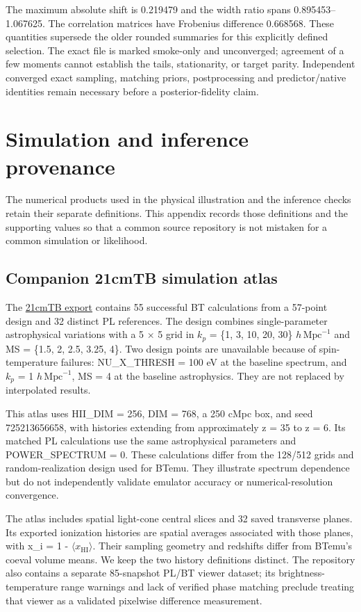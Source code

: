 The maximum absolute shift is 0.219479 and the width ratio spans 0.895453--1.067625. The correlation matrices have Frobenius difference 0.668568. These quantities supersede the older rounded summaries for this explicitly defined selection. The exact file is marked smoke-only and unconverged; agreement of a few moments cannot establish the tails, stationarity, or target parity. Independent converged exact sampling, matching priors, postprocessing and predictor/native identities remain necessary before a posterior-fidelity claim.

\section{Simulation and inference provenance}\label{app:provenance}

The numerical products used in the physical illustration and the inference checks retain their separate definitions. This appendix records those definitions and the supporting values so that a common source repository is not mistaken for a common simulation or likelihood.

\subsection{Companion 21cmTB simulation atlas}\label{companion-21cmtb-simulation-atlas}

The \href{https://github.com/HainaHuang729/21cmTB}{21cmTB export} contains 55 successful BT calculations from a 57-point design and 32 distinct PL references. The design combines single-parameter astrophysical variations with a 5 \(\times\) 5 grid in \ensuremath{k_p} = \{1, 3, 10, 20, 30\} $h\,\mathrm{Mpc}^{-1}$ and MS = \{1.5, 2, 2.5, 3.25, 4\}. Two design points are unavailable because of spin-temperature failures: NU\_X\_THRESH = 100 eV at the baseline spectrum, and \ensuremath{k_p} = 1 $h\,\mathrm{Mpc}^{-1}$, MS = 4 at the baseline astrophysics. They are not replaced by interpolated results.

This atlas uses HII\_DIM = 256, DIM = 768, a 250 cMpc box, and seed 725213656658, with histories extending from approximately z = 35 to z = 6. Its matched PL calculations use the same astrophysical parameters and POWER\_SPECTRUM = 0. These calculations differ from the 128/512 grids and random-realization design used for BTemu. They illustrate spectrum dependence but do not independently validate emulator accuracy or numerical-resolution convergence.

The atlas includes spatial light-cone central slices and 32 saved transverse planes. Its exported ionization histories are spatial averages associated with those planes, with x\_i = 1 - \(\langle\)\ensuremath{x_{\mathrm{HI}}}\(\rangle\). Their sampling geometry and redshifts differ from BTemu's coeval volume means. We keep the two history definitions distinct. The repository also contains a separate 85-snapshot PL/BT viewer dataset; its brightness-temperature range warnings and lack of verified phase matching preclude treating that viewer as a validated pixelwise difference measurement.

